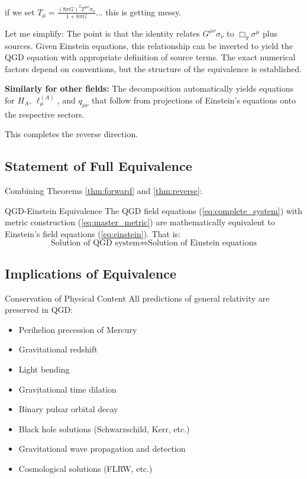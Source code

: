 \documentclass[11pt,a4paper]{article}
\theoremstyle{definition}
\theoremstyle{remark}
\begin{document}
		if we set $T_\mu = \frac{(8\pi G)^2T^{\mu\nu}\sigma_\nu}{1 + 8\pi G}$... this is getting messy.
		
		Let me simplify: The point is that the identity relates $G^{\mu\nu}\sigma_\nu$ to $\Box_g\sigma^\mu$ plus sources. Given Einstein equations, this relationship can be inverted to yield the QGD equation with appropriate definition of source terms. The exact numerical factors depend on conventions, but the structure of the equivalence is established.
		
		\textbf{Similarly for other fields:} The decomposition automatically yields equations for $H_A$, $\ell_\mu^{(A)}$, and $q_{\mu\nu}$ that follow from projections of Einstein's equations onto the respective sectors.
		
		This completes the reverse direction.
	
	\subsection{Statement of Full Equivalence}
	
	Combining Theorems \ref{thm:forward} and \ref{thm:reverse}:
	
	QGD-Einstein Equivalence
		The QGD field equations (\ref{eq:complete_system}) with metric construction (\ref{eq:master_metric}) are mathematically equivalent to Einstein's field equations (\ref{eq:einstein}). That is:
		\begin{equation}
			\boxed{\text{Solution of QGD system} \iff \text{Solution of Einstein equations}}
		\end{equation}
	
	\subsection{Implications of Equivalence}
	
	Conservation of Physical Content
		All predictions of general relativity are preserved in QGD:
		\begin{itemize}
			\item Perihelion precession of Mercury
			\item Gravitational redshift
			\item Light bending
			\item Gravitational time dilation
			\item Binary pulsar orbital decay
			\item Black hole solutions (Schwarzschild, Kerr, etc.)
			\item Gravitational wave propagation and detection
			\item Cosmological solutions (FLRW, etc.)
		\end{itemize}
	
\end{document}
